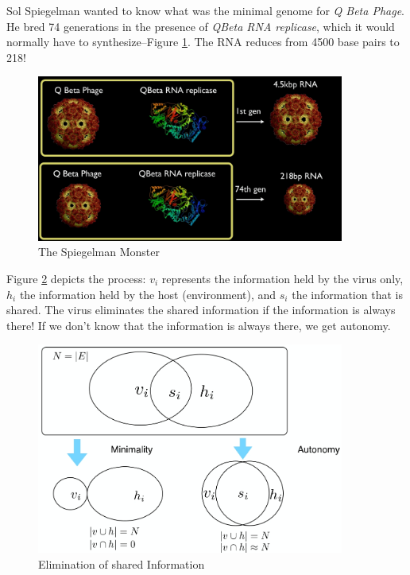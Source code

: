 \documentclass[]{article}
\begin{document}
Sol Spiegelman wanted to know what was the minimal genome for \textit{Q Beta Phage}. He bred 74 generations in the presence of \textit{QBeta RNA replicase}, which it would normally have to synthesize--Figure \ref{fig:SpiegelmanMonster}. The RNA reduces from 4500 base pairs to 218!\cite{spiegelman1965synthesis}
\begin{figure}[H]
	\caption{The Spiegelman Monster}\label{fig:SpiegelmanMonster}
	\includegraphics[width=0.9\textwidth]{SpiegelmanMonster}
\end{figure}

Figure \ref{fig:SpiegelmanMonsterVenn} depicts the process: $v_i$ represents the information held by the virus only, $h_i$ the information held by the host (environment), and $s_i$ the information that is shared. The virus eliminates the shared information if the information is always there! If we don't know that the information is always there, we get autonomy.

\begin{figure}[H]
	\caption{Elimination of shared Information}\label{fig:SpiegelmanMonsterVenn}
	\includegraphics[width=0.9\textwidth]{SpiegelmanMonsterVenn}
\end{figure}
\end{document}
